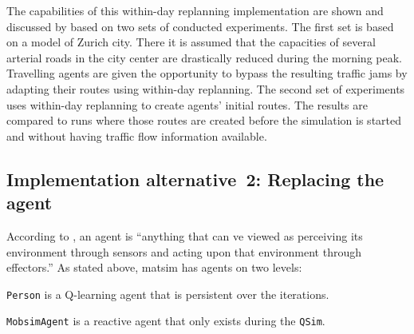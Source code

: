 


The capabilities of this within-day replanning implementation are shown and discussed by \citet{Dobler_PhDThesis_2013} based on two sets of conducted experiments. The first set is based on a model of Zurich city. There it is assumed that the capacities of several arterial roads in the city center are drastically reduced during the morning peak. Travelling agents are given the opportunity to bypass the resulting traffic jams by adapting their routes using within-day replanning.   The second set of experiments uses within-day replanning to create agents' initial routes. The results are compared to runs where those routes are created before the simulation is started and without having traffic flow information available. 

\subsection{Implementation alternative~2: Replacing the agent}
\label{sec:impl-repl-the-ag}

According to \cite{RussellNorvigBook}, an agent is ``anything that can ve viewed as perceiving its environment through sensors and acting upon that environment through effectors.''  As stated above, \acrshort{matsim} has agents on two levels:
\begin{compactitem}

\item \verb$Person$ is a Q-learning agent that is persistent over the iterations.

\item \verb$MobsimAgent$ is a reactive agent that only exists during the \verb$QSim$.

\end{compactitem}

